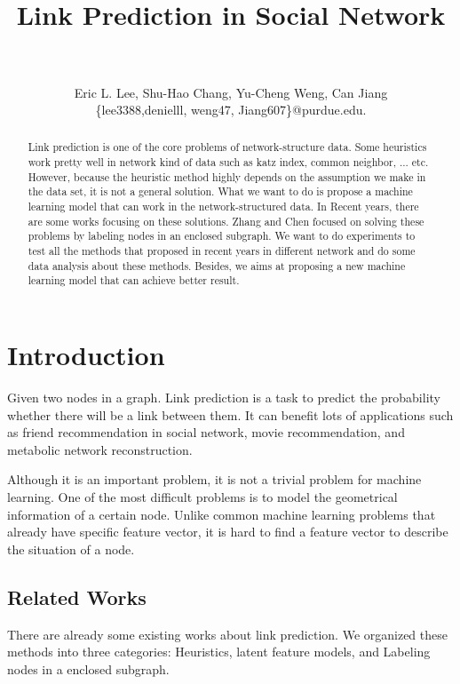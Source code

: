 \documentclass[paper=letter, fontsize=12pt]{scrartcl} %
\title{	
	\normalfont \normalsize 
	\horrule{2pt} \\[0.4cm] %
	{\LARGE Link Prediction in Social Network} \\ %
	\horrule{1pt} \\[0.5cm] %
}
\author{\large{Eric L. Lee, Shu-Hao Chang, Yu-Cheng Weng, Can Jiang}\\
	\normalsize{\{lee3388,denielll, weng47, Jiang607\}@purdue.edu.}
} %
\date{} %
\begin{document}
	
	\maketitle %
	
	\begin{abstract}
		Link prediction is one of the core problems of network-structure data. Some heuristics work pretty well in network kind of data such as katz index\cite{katz}, common neighbor, ... etc. However, because the heuristic method highly depends on the assumption we make in the data set, it is not a general solution. What we want to do is propose a machine learning model that can work in the network-structured data. In Recent years, there are some works focusing on these solutions. Zhang and Chen \cite{lpnn} \cite{wlnn} focused on solving these problems by labeling nodes in an enclosed subgraph. We want to do experiments to test all the methods that proposed in recent years in different network and do some data analysis about these methods. Besides, we aims at proposing a new machine learning model that can achieve better result.
	\end{abstract}
	
	\section{Introduction}
	Given two nodes in a graph. Link prediction is a task to predict the probability whether there will be a link between them. It can benefit lots of applications such as friend recommendation in social network, movie recommendation, and metabolic network reconstruction.
	
	Although it is an important problem, it is not a trivial problem for machine learning. One of the most difficult problems is to model the geometrical information of a certain node. Unlike common machine learning problems that already have specific feature vector, it is hard to find a feature vector to describe the situation of a node.
	
	\subsection {Related Works}
	There are already some existing works about link prediction. We organized these methods into three categories: Heuristics, latent feature models, and  Labeling nodes in a enclosed subgraph.
	
\end{document}

